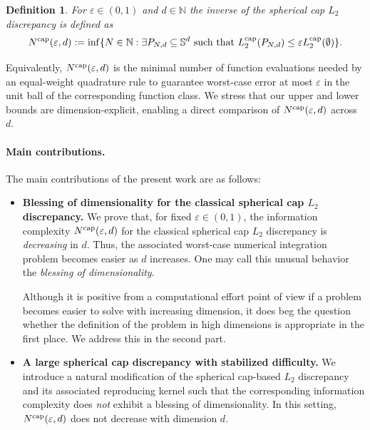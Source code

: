 \documentclass[12pt]{article}
\newcommand{\cp}{{\rm cap}}
\newtheorem{definition}{Definition}
\begin{document}
\begin{definition}\rm
For $\varepsilon \in (0,1)$ and $d \in \mathbb{N}$ the inverse of the spherical cap $L_2$ discrepancy is defined as 
\begin{equation*}
N^{\cp}(\varepsilon, d) := \inf \{ N \in \mathbb{N}: \exists P_{N,d} \subseteq \mathbb{S}^d \ \text{such that}\ L_2^{\cp}(P_{N,d}) \le \varepsilon L_2^{\cp}(\emptyset) \}.
\end{equation*}
\end{definition}
Equivalently, $N^{\cp}(\varepsilon,d)$ is the minimal number of function evaluations needed by an equal-weight quadrature rule to guarantee worst-case error at most $\varepsilon$ in the unit ball of the corresponding function class. We stress that our upper and lower bounds are dimension-explicit, enabling a direct comparison of $N^{\cp}(\varepsilon,d)$ across $d$.




\paragraph{Main contributions.} The main contributions of the present work are as follows:
\begin{itemize}
  \item \textbf{Blessing of dimensionality for the classical spherical cap $L_2$ discrepancy.} We prove that, for fixed $\varepsilon\in(0,1)$, the information complexity $N^{\cp}(\varepsilon,d)$ for the classical spherical cap $L_{2}$ discrepancy is \emph{decreasing} in $d$. Thus, the associated worst-case numerical integration problem becomes easier as $d$ increases. One may call this unusual behavior the \emph{blessing of dimensionality}.

  Although it is positive from a computational effort point of view if a problem becomes easier to solve with increasing dimension, it does beg the question whether the definition of the problem in high dimensions is appropriate in the first place. We address this in the second part.
 
  \item \textbf{A large spherical cap discrepancy with stabilized difficulty.} We introduce a natural modification of the spherical cap-based $L_2$ discrepancy and its associated reproducing kernel such that the corresponding information complexity does \emph{not} exhibit a blessing of dimensionality. In this setting, $N^{\cp}(\varepsilon,d)$ does not decrease with dimension $d$. 
\end{itemize}
\end{document}
